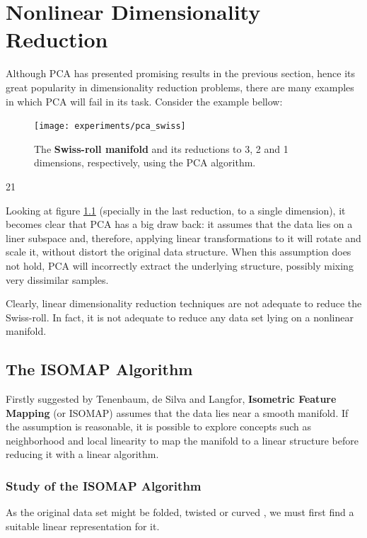 \chapter{Nonlinear Dimensionality Reduction}

Although PCA has presented promising results in the previous section, hence its great popularity in dimensionality reduction problems, there are many examples in which PCA will fail in its task. Consider the example bellow:

\begin{figure}[H]
	\centering
	\captionsetup{justification=centering}

	\texttt{[image: experiments/pca\_swiss]}
	\caption{The \textbf{Swiss-roll manifold} and its reductions to 3, 2 and 1 dimensions, respectively, using the PCA algorithm.}
	\label{fig:swiss_pca}
\end{figure}21

Looking at figure \ref{fig:swiss_pca} (specially in the last reduction, to a single dimension), it becomes clear that PCA has a big draw back: it assumes that the data lies on a liner subspace \cite{cay2005} and, therefore, applying linear transformations to it will rotate and scale it, without distort the original data structure. When this assumption does not hold, PCA will incorrectly extract the underlying structure, possibly mixing very dissimilar samples.

Clearly, linear dimensionality reduction techniques are not adequate to reduce the Swiss-roll. In fact, it is not adequate to reduce any data set lying on a nonlinear manifold.

\section{The ISOMAP Algorithm}

Firstly suggested by Tenenbaum, de Silva and Langfor, \textbf{Isometric Feature Mapping} (or ISOMAP) assumes that the data lies near a smooth manifold. If the assumption is reasonable, it is possible to explore concepts such as neighborhood and local linearity to map the manifold to a linear structure before reducing it with a linear algorithm.

\subsection{Study of the ISOMAP Algorithm}
\label{sec:studying_ISOMAP}

As the original data set might be folded, twisted or curved \cite{ten2000}, we must first find a suitable linear representation for it.

